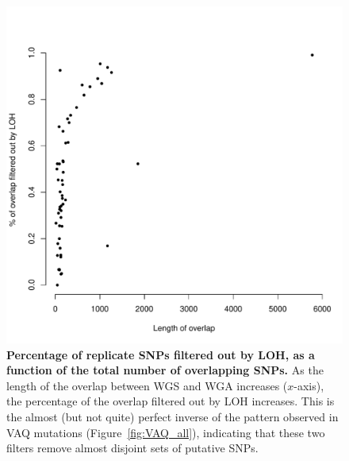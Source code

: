 \documentclass[11pt]{article} %
\begin{document}
\begin{figure}
\centerline{
\includegraphics[width=5in]{./LOH_VAQ/LOH_all.pdf} }
\caption{\textbf{Percentage of replicate SNPs filtered out by LOH, as a function of the total number of overlapping SNPs.} As the length of the overlap between WGS and WGA increases ($x$-axis), the percentage of the overlap filtered out by LOH increases. This is the almost (but not quite) perfect inverse of the pattern observed in VAQ mutations (Figure~\ref{fig:VAQ_all}), indicating that these two filters remove almost disjoint sets of putative SNPs.}
\label{fig:LOH_all}
\end{figure}
\end{document}
